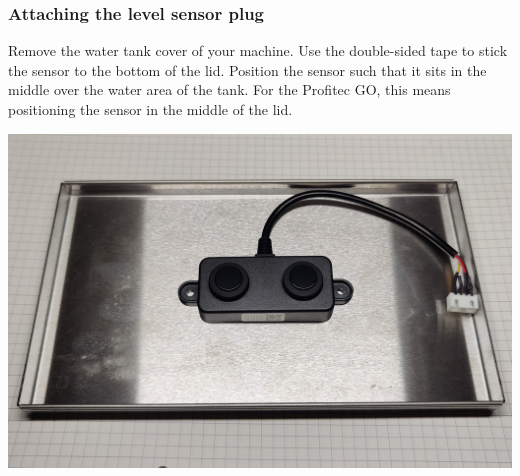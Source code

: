 \documentclass[]{article}
\begin{document}
\subsubsection{Attaching the level sensor plug}
\begin{minipage}[t]{0.5\linewidth}
	\vspace{0pt}
	Remove the water tank cover of your machine. Use the double-sided tape to stick the sensor to the bottom of the lid. Position the sensor such that it sits in the middle over the water area of the tank. For the Profitec GO, this means positioning the sensor in the middle of the lid.
\end{minipage}
\hfill
\begin{minipage}[t]{0.4\linewidth}
	\vspace{0pt}
	\includegraphics[width=\linewidth]{images/02_wiring/02_lid_sensor.jpg}
\end{minipage}
\end{document}
